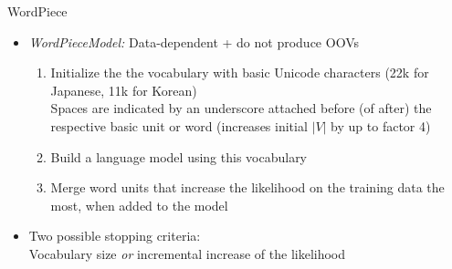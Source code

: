 \documentclass[11pt,compress,t,notes=noshow, xcolor=table]{beamer}
\begin{document}

\begin{frame}{WordPiece}

\vfill

	\begin{itemize}
		\item \textit{WordPieceModel:} Data-dependent + do not produce OOVs
			\begin{enumerate}
				\item Initialize the the vocabulary with basic Unicode characters (22k for Japanese, 11k for Korean)\\
							\warning Spaces are indicated by an underscore attached before (of after) the respective basic unit or word (increases initial $|V|$ by up to factor 4)
				\item Build a language model using this vocabulary
				\item Merge word units that increase the likelihood on the training data the most, when added to the model
			\end{enumerate}
		\item Two possible stopping criteria:\\Vocabulary size \textit{or} incremental increase of the likelihood
	\end{itemize}
	
\vfill

\end{frame}

\end{document}
